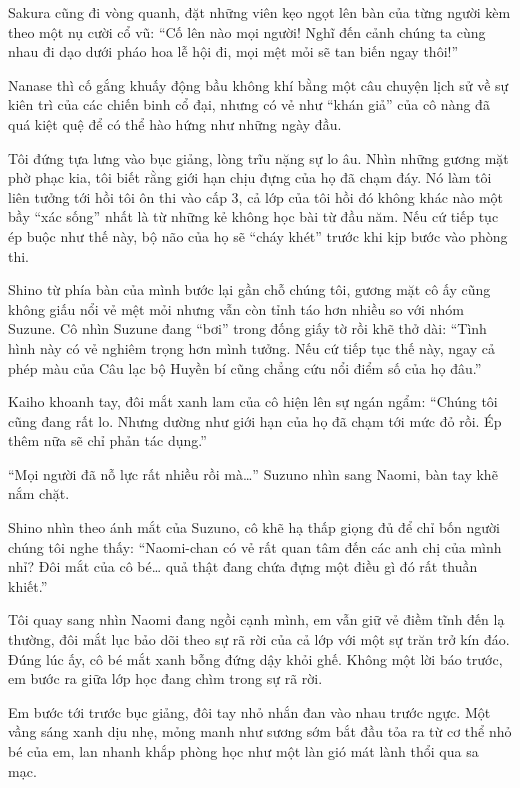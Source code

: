 \documentclass[../main.tex]{subfiles}
\begin{document}
Sakura cũng đi vòng quanh, đặt những viên kẹo ngọt lên bàn của từng người kèm theo một nụ cười cổ vũ: ``Cố lên nào mọi người! Nghĩ đến cảnh chúng ta cùng nhau đi dạo dưới pháo hoa lễ hội đi, mọi mệt mỏi sẽ tan biến ngay thôi!''

Nanase thì cố gắng khuấy động bầu không khí bằng một câu chuyện lịch sử về sự kiên trì của các chiến binh cổ đại, nhưng có vẻ như ``khán giả'' của cô nàng đã quá kiệt quệ để có thể hào hứng như những ngày đầu.

Tôi đứng tựa lưng vào bục giảng, lòng trĩu nặng sự lo âu. Nhìn những gương mặt phờ phạc kia, tôi biết rằng giới hạn chịu đựng của họ đã chạm đáy. Nó làm tôi liên tưởng tới hồi tôi ôn thi vào cấp 3, cả lớp của tôi hồi đó không khác nào một bầy ``xác sống'' nhất là từ những kẻ không học bài từ đầu năm. Nếu cứ tiếp tục ép buộc như thế này, bộ não của họ sẽ ``cháy khét'' trước khi kịp bước vào phòng thi.

Shino từ phía bàn của mình bước lại gần chỗ chúng tôi, gương mặt cô ấy cũng không giấu nổi vẻ mệt mỏi nhưng vẫn còn tỉnh táo hơn nhiều so với nhóm Suzune. Cô nhìn Suzune đang ``bơi'' trong đống giấy tờ rồi khẽ thở dài: ``Tình hình này có vẻ nghiêm trọng hơn mình tưởng. Nếu cứ tiếp tục thế này, ngay cả phép màu của Câu lạc bộ Huyền bí cũng chẳng cứu nổi điểm số của họ đâu.''

Kaiho khoanh tay, đôi mắt xanh lam của cô hiện lên sự ngán ngẩm: ``Chúng tôi cũng đang rất lo. Nhưng dường như giới hạn của họ đã chạm tới mức đỏ rồi. Ép thêm nữa sẽ chỉ phản tác dụng.''

``Mọi người đã nỗ lực rất nhiều rồi mà\dots'' Suzuno nhìn sang Naomi, bàn tay khẽ nắm chặt.

Shino nhìn theo ánh mắt của Suzuno, cô khẽ hạ thấp giọng đủ để chỉ bốn người chúng tôi nghe thấy: ``Naomi-chan có vẻ rất quan tâm đến các anh chị của mình nhỉ? Đôi mắt của cô bé\dots{} quả thật đang chứa đựng một điều gì đó rất thuần khiết.''

Tôi quay sang nhìn Naomi đang ngồi cạnh mình, em vẫn giữ vẻ điềm tĩnh đến lạ thường, đôi mắt lục bảo dõi theo sự rã rời của cả lớp với một sự trăn trở kín đáo. Đúng lúc ấy, cô bé mắt xanh bỗng đứng dậy khỏi ghế. Không một lời báo trước, em bước ra giữa lớp học đang chìm trong sự rã rời.

Em bước tới trước bục giảng, đôi tay nhỏ nhắn đan vào nhau trước ngực. Một vầng sáng xanh dịu nhẹ, mỏng manh như sương sớm bắt đầu tỏa ra từ cơ thể nhỏ bé của em, lan nhanh khắp phòng học như một làn gió mát lành thổi qua sa mạc.
\end{document}
